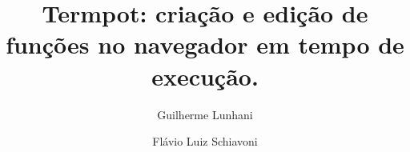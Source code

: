 \title{Termpot: criação e edição de funções no navegador em tempo de execução.}

\author{Guilherme Lunhani
        \and 
        Flávio Luiz Schiavoni}

\address{Instituto de Artes e Design --
         Universidade Federal de Juiz de Fora \\
         Juiz de Fora, MG
         \nextinstitute
         Departamento de Computação --
         Universidade Federal de São João Del Rei \\
         São João Del Rei, MG
}